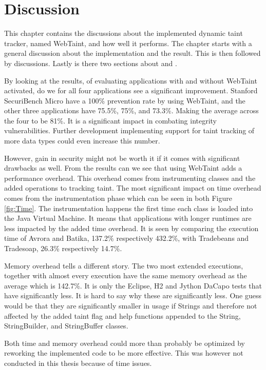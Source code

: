 \chapter{Discussion}
\label{Discussion}
This chapter contains the discussions about the implemented dynamic taint tracker, named WebTaint, and how well it performs. The chapter starts with a general discussion about the implementation and the result. This is then followed by \textit{} discussions. Lastly is there two sections about \textit{} and \textit{}.

By looking at the results, of evaluating applications with and without WebTaint activated, do we for all four applications see a significant improvement. Stanford SecuriBench Micro have a 100\% prevention rate by using WebTaint, and the other three applications have 75.5\%, 75\%, and 73.3\%. Making the average across the four to be 81\%. It is a significant impact in combating integrity vulnerabilities. Further development implementing support for taint tracking of more data types could even increase this number.

However, gain in security might not be worth it if it comes with significant drawbacks as well. From the results can we see that using WebTaint adds a performance overhead. This overhead comes from instrumenting classes and the added operations to tracking taint. The most significant impact on time overhead comes from the instrumentation phase which can be seen in both Figure \ref{fig:Time}. The instrumentation happens the first time each class is loaded into the Java Virtual Machine. It means that applications with longer runtimes are less impacted by the added time overhead. It is seen by comparing the execution time of Avrora and Batika, 137.2\% respectively 432.2\%, with Tradebeans and Tradesoap, 26.3\% respectively 14.7\%.

Memory overhead tells a different story. The two most extended executions, together with almost every execution have the same memory overhead as the average which is 142.7\%. It is only the Eclipse, H2 and Jython DaCapo tests that have significantly less. It is hard to say why these are significantly less. One guess would be that they are significantly smaller in usage if Strings and therefore not affected by the added taint flag and help functions appended to the String, StringBuilder, and StringBuffer classes.

Both time and memory overhead could more than probably be optimized by reworking the implemented code to be more effective. This was however not conducted in this thesis because of time issues.

